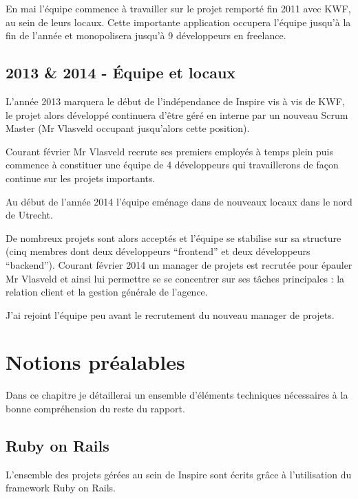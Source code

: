 \documentclass[12pt,a4paper]{book}
\begin{document}
En mai l'équipe commence à travailler sur le projet remporté fin 2011 avec KWF, au sein de leurs locaux. Cette importante application occupera l'équipe jusqu'à la fin de l'année et monopolisera jusqu'à 9 développeurs en freelance.

\section{2013 \& 2014 - Équipe et locaux}

L'année 2013 marquera le début de l'indépendance de Inspire vis à vis de KWF, le projet alors développé continuera d'être géré en interne par un nouveau Scrum Master (Mr Vlasveld occupant jusqu'alors cette position).

Courant février Mr Vlasveld recrute ses premiers employés à temps plein puis commence à constituer une équipe de 4 développeurs qui travaillerons de façon continue sur les projets importants.

Au début de l'année 2014 l'équipe eménage dans de nouveaux locaux dans le nord de Utrecht.

De nombreux projets sont alors acceptés et l'équipe se stabilise sur sa structure (cinq membres dont deux développeurs ``frontend'' et deux développeurs ``backend''). Courant février 2014 un manager de projets est recrutée pour épauler Mr Vlasveld et ainsi lui permettre se se concentrer sur ses tâches principales : la relation client et la gestion générale de l'agence.

J'ai rejoint l'équipe peu avant le recrutement du nouveau manager de projets.

\chapter{Notions préalables}

Dans ce chapitre je détaillerai un ensemble d'éléments techniques nécessaires à la bonne compréhension du reste du rapport.

\section{Ruby on Rails}

L'ensemble des projets gérées au sein de Inspire sont écrits grâce à l'utilisation du framework Ruby on Rails.
\end{document}
